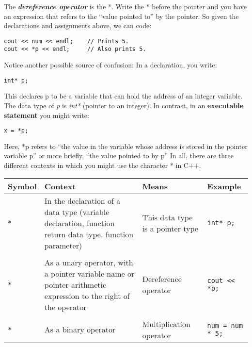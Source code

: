 \documentclass{report}
\begin{document}
\bigbreak \noindent
The \textit{\textbf{dereference operator}} is the *. Write the * before the pointer and you have an expression that refers to the ``value pointed to'' by the pointer.
\bigbreak \noindent
So given the declarations and assignments above, we can code:
\begin{mdframed}
\begin{verbatim}
cout << num << endl;    // Prints 5.
cout << *p << endl;     // Also prints 5.
\end{verbatim}
\end{mdframed}
Notice another possible source of confusion:
\bigbreak \noindent
In a declaration, you write:
\begin{mdframed}
\begin{verbatim}
int* p;
\end{verbatim}
\end{mdframed}
This declares p to be a variable that can hold the address of an integer variable. The data type of \textit{p} is \textit{int*} (pointer to an integer).
\bigbreak \noindent
In contrast, in an \textbf{executable statement} you might write:
\begin{mdframed}
\begin{verbatim}
x = *p;
\end{verbatim}
\end{mdframed}
Here, *p refers to ``the value in the variable whose address is stored in the pointer variable p'' or more briefly, ``the value pointed to by p''
\bigbreak \noindent
\newpage
\noindent In all, there are three different contexts in which you might use the character * in C++.
\bigbreak \noindent
\begin{tabularx}{\textwidth}{@{}lXlX@{}}
\toprule
\textbf{Symbol} & \textbf{Context} & \textbf{Means} & \textbf{Example} \\
\midrule
\texttt{*} & In the declaration of a data type (variable declaration, function return data type, function parameter) & This data type is a pointer type & \texttt{int* p;} \\ \\
\texttt{*} & As a unary operator, with a pointer variable name or pointer arithmetic expression to the right of the operator & Dereference operator & \texttt{cout << *p;} \\ \\ 
\texttt{*} & As a binary operator & Multiplication operator & \texttt{num = num * 5;} \\
\bottomrule
\end{tabularx}
\end{document}
